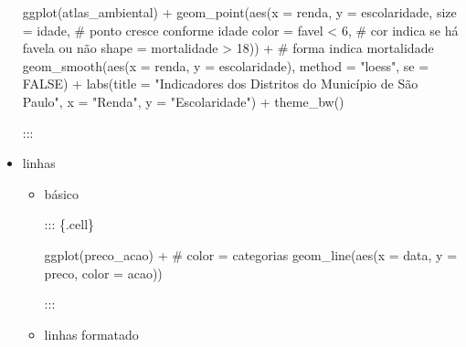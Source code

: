 \documentclass[
  letterpaper,
  DIV=11,
  numbers=noendperiod]{scrreprt}
\newenvironment{Shaded}{\begin{snugshade}}{\end{snugshade}}
\newcommand{\AttributeTok}[1]{\textcolor[rgb]{0.40,0.45,0.13}{#1}}
\newcommand{\CommentTok}[1]{\textcolor[rgb]{0.37,0.37,0.37}{#1}}
\newcommand{\ConstantTok}[1]{\textcolor[rgb]{0.56,0.35,0.01}{#1}}
\newcommand{\DecValTok}[1]{\textcolor[rgb]{0.68,0.00,0.00}{#1}}
\newcommand{\FunctionTok}[1]{\textcolor[rgb]{0.28,0.35,0.67}{#1}}
\newcommand{\NormalTok}[1]{\textcolor[rgb]{0.00,0.23,0.31}{#1}}
\newcommand{\SpecialCharTok}[1]{\textcolor[rgb]{0.37,0.37,0.37}{#1}}
\newcommand{\StringTok}[1]{\textcolor[rgb]{0.13,0.47,0.30}{#1}}
\begin{document}
\begin{itemize}
\begin{Shaded}
\begin{Highlighting}[]
\FunctionTok{ggplot}\NormalTok{(atlas\_ambiental) }\SpecialCharTok{+}
    \FunctionTok{geom\_point}\NormalTok{(}\FunctionTok{aes}\NormalTok{(}\AttributeTok{x =}\NormalTok{ renda, }\AttributeTok{y =}\NormalTok{ escolaridade, }
                    \AttributeTok{size =}\NormalTok{ idade,                }\CommentTok{\# ponto cresce conforme idade}
                    \AttributeTok{color =}\NormalTok{ favel }\SpecialCharTok{\textless{}} \DecValTok{6}\NormalTok{,           }\CommentTok{\# cor indica se há favela ou não}
                    \AttributeTok{shape =}\NormalTok{ mortalidade }\SpecialCharTok{\textgreater{}} \DecValTok{18}\NormalTok{)) }\SpecialCharTok{+} \CommentTok{\# forma indica mortalidade}
    \FunctionTok{geom\_smooth}\NormalTok{(}\FunctionTok{aes}\NormalTok{(}\AttributeTok{x =}\NormalTok{ renda, }\AttributeTok{y =}\NormalTok{ escolaridade), }\AttributeTok{method =} \StringTok{"loess"}\NormalTok{, }\AttributeTok{se =} \ConstantTok{FALSE}\NormalTok{) }\SpecialCharTok{+}
    \FunctionTok{labs}\NormalTok{(}\AttributeTok{title =} \StringTok{"Indicadores dos Distritos do Município de São Paulo"}\NormalTok{,}
        \AttributeTok{x =} \StringTok{"Renda"}\NormalTok{,}
        \AttributeTok{y =} \StringTok{"Escolaridade"}\NormalTok{) }\SpecialCharTok{+}
    \FunctionTok{theme\_bw}\NormalTok{()   }
\end{Highlighting}
\end{Shaded}

  :::
\item
  linhas

  \begin{itemize}
  \item
    básico

    ::: \{.cell\}

\begin{Shaded}
\begin{Highlighting}[]
    \FunctionTok{ggplot}\NormalTok{(preco\_acao) }\SpecialCharTok{+}
        \CommentTok{\# color = categorias}
        \FunctionTok{geom\_line}\NormalTok{(}\FunctionTok{aes}\NormalTok{(}\AttributeTok{x =}\NormalTok{ data, }\AttributeTok{y =}\NormalTok{ preco, }\AttributeTok{color =}\NormalTok{ acao))    }
\end{Highlighting}
\end{Shaded}

    :::
  \item
    linhas formatado


\end{itemize}
\end{itemize}
\end{document}
